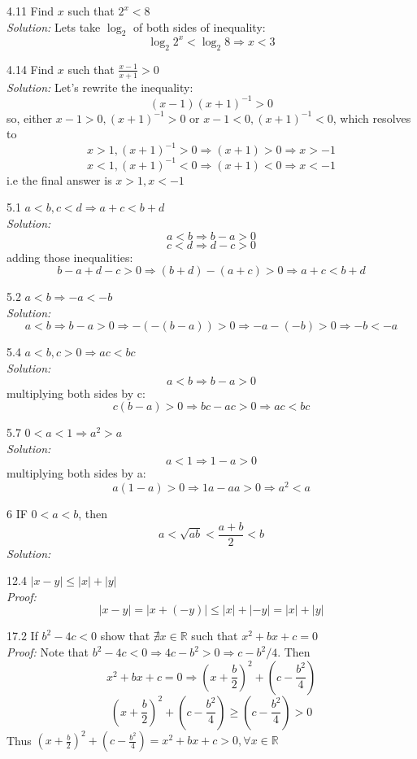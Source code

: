 \documentclass[a4paper, 11pt]{article}
\begin{document}
\hrulefill

4.11 Find $x$ such that $2^x < 8$\\
\emph{Solution:} 
Lets take $\log_2$ of both sides of inequality:
$$\log_2{2^x} < \log_2{8} \Rightarrow x < 3$$

\hrulefill

4.14 Find $x$ such that $\frac{x - 1}{x + 1} > 0$\\
\emph{Solution:}
Let's rewrite the inequality:
$$(x - 1)(x + 1)^{-1} > 0$$
so, either $x - 1 > 0, (x + 1)^{-1} > 0$ or $x - 1 < 0, (x + 1)^{-1} < 0$, which resolves to
$$x > 1, (x + 1)^{-1} > 0 \Rightarrow (x + 1) > 0 \Rightarrow x > - 1$$
$$x < 1, (x + 1)^{-1} < 0 \Rightarrow (x + 1) < 0 \Rightarrow x < - 1$$
i.e the final answer is $x > 1, x < -1$

\hrulefill

5.1 $a < b, c < d \Rightarrow a + c < b + d$\\
\emph{Solution:}
$$a < b \Rightarrow b - a > 0$$
$$c < d \Rightarrow d - c > 0$$
adding those inequalities:
$$b - a + d - c > 0 \Rightarrow (b + d) - (a + c) > 0 \Rightarrow a + c < b + d$$

\hrulefill

5.2 $a < b \Rightarrow -a < -b$\\
\emph{Solution:}
$$a < b \Rightarrow b - a > 0 \Rightarrow -(-(b - a)) > 0 \Rightarrow -a - (-b) > 0 \Rightarrow -b < -a$$

\hrulefill

5.4 $a < b, c > 0 \Rightarrow  ac < bc$\\
\emph{Solution:}
$$a < b \Rightarrow b - a > 0$$
multiplying both sides by c:
$$c(b - a) > 0 \Rightarrow bc - ac > 0 \Rightarrow ac < bc$$

\hrulefill

5.7 $0 < a < 1 \Rightarrow a^2 > a $\\
\emph{Solution:}
$$a < 1 \Rightarrow 1 - a > 0$$
multiplying both sides by a:
$$a(1 - a) > 0 \Rightarrow 1a - aa > 0 \Rightarrow a^2 < a$$

\hrulefill

6 IF $0 < a < b$, then
$$a < \sqrt{ab} < \frac{a + b}{2} < b$$
\emph{Solution:}

\hrulefill

12.4 $|x - y| \leq |x| + |y|$\\
\emph{Proof:}
$$|x - y| = |x + (-y)| \leq |x| + |-y| = |x| + |y|$$

\hrulefill

17.2 If $b^2 - 4c < 0$ show that $\nexists x \in \mathbb{R}$ such that $x^2 + bx + c = 0$\\
\emph{Proof:}
Note that $b^2 - 4c < 0 \Rightarrow 4c - b^2 > 0 \Rightarrow c - b^2/4$. Then
$$x^2 + bx + c = 0 \Rightarrow (x + \frac{b}{2})^2 + (c - \frac{b^2}{4})$$
$$(x + \frac{b}{2})^2 + (c - \frac{b^2}{4}) \geq (c - \frac{b^2}{4}) > 0$$
Thus $(x + \frac{b}{2})^2 + (c - \frac{b^2}{4}) = x^2 + bx + c > 0, \forall x \in \mathbb{R}$ 
\end{document}
